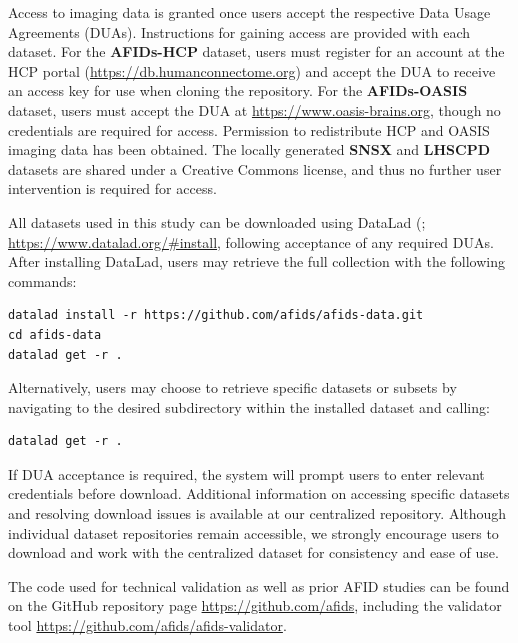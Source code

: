 Access to imaging data is granted once users accept the respective Data Usage Agreements (DUAs). Instructions for gaining access are provided with each dataset. For the \textbf{AFIDs-HCP} dataset, users must register for an account at the HCP portal (\url{https://db.humanconnectome.org}) and accept the DUA to receive an access key for use when cloning the repository. For the \textbf{AFIDs-OASIS} dataset, users must accept the DUA at \url{https://www.oasis-brains.org}, though no credentials are required for access. Permission to redistribute HCP and OASIS imaging data has been obtained. The locally generated \textbf{SNSX} and \textbf{LHSCPD} datasets are shared under a Creative Commons license, and thus no further user intervention is required for access.

All datasets used in this study can be downloaded using DataLad (\cite{Halchenko2021-px}; \url{https://www.datalad.org/#install}, following acceptance of any required DUAs. After installing DataLad, users may retrieve the full collection with the following commands:
\begin{verbatim}
datalad install -r https://github.com/afids/afids-data.git
cd afids-data
datalad get -r .
\end{verbatim}

Alternatively, users may choose to retrieve specific datasets or subsets by navigating to the desired subdirectory within the installed dataset and calling:
\begin{verbatim}
datalad get -r .
\end{verbatim}

If DUA acceptance is required, the system will prompt users to enter relevant credentials before download. Additional information on accessing specific datasets and resolving download issues is available at our centralized repository. Although individual dataset repositories remain accessible, we strongly encourage users to download and work with the centralized dataset for consistency and ease of use.

The code used for technical validation as well as prior AFID studies can be found on the GitHub repository page \url{https://github.com/afids}, including the validator tool \url{https://github.com/afids/afids-validator}.

